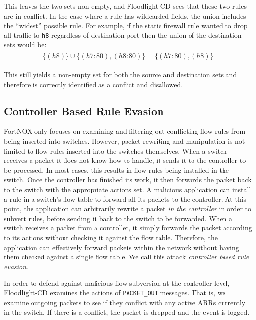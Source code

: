 This leaves the two sets non-empty, and Floodlight-CD sees that these two rules are in conflict.
In the case where a rule has wildcarded fields, the union includes the ``widest'' possible rule.
For example, if the static firewall rule wanted to drop all traffic to \texttt{h8} regardless of destination port then the union of the destination sets would be:
\begin{align}
\begin{aligned}
\{(h8)\} \cup \{(h7:80),(h8:80)\} =  \{(h7:80),(h8)\} \nonumber
\end{aligned}
\end{align}

This still yields a non-empty set for both the source and destination sets and therefore is correctly identified as a conflict and disallowed.

\subsection{Controller Based Rule Evasion}
\label{subsec:cbre}

FortNOX only focuses on examining and filtering out conflicting flow rules from being inserted into switches. 
However, packet rewriting and manipulation is not limited to flow rules inserted into the switches themselves. 
When a switch receives a packet it does not know how to handle, it sends it to the controller to be processed.
In most cases, this results in flow rules being installed in the switch.
Once the controller has finished its work, it then forwards the packet back to the switch with the appropriate actions set.
A malicious application can install a rule in a switch's flow table to forward all its packets to the controller.
At this point, the application can arbitrarily rewrite a packet \emph{in the controller} in order to subvert rules, before sending it back to the switch to be forwarded. 
When a switch receives a packet from a controller, it simply forwards the packet according to its actions without checking it against the flow table.
Therefore, the application can effectively forward packets within the network without having them checked against a single flow table.
We call this attack \emph{controller based rule evasion}.

In order to defend against malicious flow subversion at the controller level, Floodlight-CD examines the actions of \texttt{PACKET\_OUT} messages. 
That is, we examine outgoing packets to see if they conflict with any active ARRs currently in the switch. 
If there is a conflict, the packet is dropped and the event is logged.


